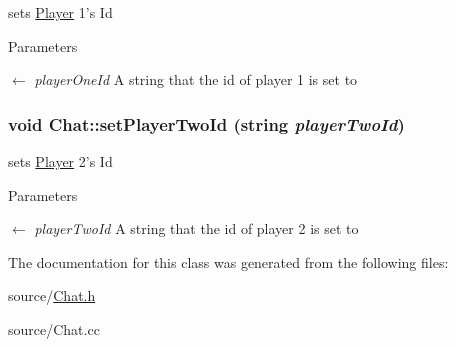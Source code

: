 sets \hyperlink{classPlayer}{Player} 1's Id 
\begin{DoxyParams}{Parameters}
\item[\mbox{$\leftarrow$} {\em playerOneId}]A string that the id of player 1 is set to \end{DoxyParams}
\hypertarget{classChat_ae81fb0422bd13afef5a18836d6c24a78}{
\subsubsection[{setPlayerTwoId}]{\setlength{\rightskip}{0pt plus 5cm}void Chat::setPlayerTwoId (string {\em playerTwoId})}}
\label{classChat_ae81fb0422bd13afef5a18836d6c24a78}


sets \hyperlink{classPlayer}{Player} 2's Id 
\begin{DoxyParams}{Parameters}
\item[\mbox{$\leftarrow$} {\em playerTwoId}]A string that the id of player 2 is set to \end{DoxyParams}


The documentation for this class was generated from the following files:\begin{DoxyCompactItemize}
\item 
source/\hyperlink{Chat_8h}{Chat.h}\item 
source/Chat.cc\end{DoxyCompactItemize}
